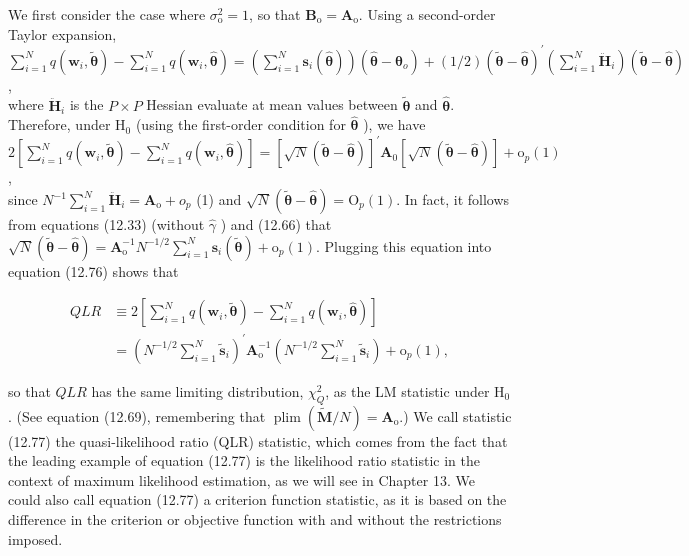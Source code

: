 \documentclass[10pt]{article}
\begin{document}
We first consider the case where $\sigma_{\mathrm{o}}^{2}=1$, so that $\mathbf{B}_{\mathrm{o}}=\mathbf{A}_{\mathrm{o}}$. Using a second-order Taylor expansion,\\
$\sum_{i=1}^{N} q\left(\mathbf{w}_{i}, \tilde{\boldsymbol{\theta}}\right)-\sum_{i=1}^{N} q\left(\mathbf{w}_{i}, \hat{\boldsymbol{\theta}}\right)=\left(\sum_{i=1}^{N} \mathbf{s}_{i}(\hat{\boldsymbol{\theta}})\right)\left(\hat{\boldsymbol{\theta}}-\boldsymbol{\theta}_{o}\right)+(1 / 2)(\tilde{\boldsymbol{\theta}}-\hat{\boldsymbol{\theta}})^{\prime}\left(\sum_{i=1}^{N} \ddot{\mathbf{H}}_{i}\right)(\tilde{\boldsymbol{\theta}}-\hat{\boldsymbol{\theta}})$,\\
where $\ddot{\mathbf{H}}_{i}$ is the $P \times P$ Hessian evaluate at mean values between $\tilde{\boldsymbol{\theta}}$ and $\hat{\boldsymbol{\theta}}$. Therefore, under $\mathrm{H}_{0}$ (using the first-order condition for $\hat{\boldsymbol{\theta}}$ ), we have\\
$2\left[\sum_{i=1}^{N} q\left(\mathbf{w}_{i}, \tilde{\boldsymbol{\theta}}\right)-\sum_{i=1}^{N} q\left(\mathbf{w}_{i}, \hat{\boldsymbol{\theta}}\right)\right]=[\sqrt{N}(\tilde{\boldsymbol{\theta}}-\hat{\boldsymbol{\theta}})]^{\prime} \mathbf{A}_{0}[\sqrt{N}(\tilde{\boldsymbol{\theta}}-\hat{\boldsymbol{\theta}})]+\mathrm{o}_{p}(1)$,\\
since $N^{-1} \sum_{i=1}^{N} \ddot{\mathbf{H}}_{i}=\mathbf{A}_{\mathrm{o}}+o_{p}$ (1) and $\sqrt{N}(\tilde{\boldsymbol{\theta}}-\hat{\boldsymbol{\theta}})=\mathrm{O}_{p}(1)$. In fact, it follows from equations (12.33) (without $\hat{\gamma}$ ) and (12.66) that $\sqrt{N}(\tilde{\boldsymbol{\theta}}-\hat{\boldsymbol{\theta}})=\mathbf{A}_{\mathrm{o}}^{-1} N^{-1 / 2} \sum_{i=1}^{N} \mathbf{s}_{i}(\tilde{\boldsymbol{\theta}})+ \mathrm{o}_{p}(1)$. Plugging this equation into equation (12.76) shows that


\begin{align*}
Q L R & \equiv 2\left[\sum_{i=1}^{N} q\left(\mathbf{w}_{i}, \tilde{\boldsymbol{\theta}}\right)-\sum_{i=1}^{N} q\left(\mathbf{w}_{i}, \hat{\boldsymbol{\theta}}\right)\right] \\
& =\left(N^{-1 / 2} \sum_{i=1}^{N} \tilde{\mathbf{s}}_{i}\right)^{\prime} \mathbf{A}_{\mathrm{o}}^{-1}\left(N^{-1 / 2} \sum_{i=1}^{N} \tilde{\mathbf{s}}_{i}\right)+\mathrm{o}_{p}(1), \tag{12.77}
\end{align*}


so that $Q L R$ has the same limiting distribution, $\chi_{Q}^{2}$, as the LM statistic under $\mathrm{H}_{0}$. (See equation (12.69), remembering that $\operatorname{plim}(\tilde{\mathbf{M}} / N)=\mathbf{A}_{\mathrm{o}}$.) We call statistic (12.77) the quasi-likelihood ratio (QLR) statistic, which comes from the fact that the leading example of equation (12.77) is the likelihood ratio statistic in the context of maximum likelihood estimation, as we will see in Chapter 13. We could also call equation (12.77) a criterion function statistic, as it is based on the difference in the criterion or objective function with and without the restrictions imposed.
\end{document}
